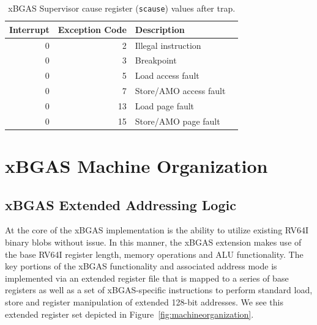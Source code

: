 \documentclass{article}
\begin{document}
\begin{table}[h!]
\begin{center}
\begin{tabular}{|r|r|l|l|}

  \hline
  Interrupt & Exception Code  & Description \\
  \hline	 
  0         & 2               & Illegal instruction \\   
  0         & 3               & Breakpoint \\
  0         & 5               & Load access fault \\
  0         & 7               & Store/AMO access fault \\
  0         & 13              & Load page fault \\
  0         & 15              & Store/AMO page fault \\
  \hline
\end{tabular}
\end{center}
\caption{xBGAS Supervisor cause register ({\tt scause}) values after trap.}
\label{scauses}
\end{table}

\clearpage
\section{xBGAS Machine Organization}

\subsection{xBGAS Extended Addressing Logic}

At the core of the xBGAS implementation is the ability to utilize existing RV64I 
binary blobs without issue.  In this manner, the xBGAS extension makes use 
of the base RV64I register length, memory operations and ALU functionality.  
The key portions of the xBGAS functionality and associated address mode 
is implemented via an extended register file that is mapped to a series 
of base registers as well as a set of xBGAS-specific instructions to perform 
standard load, store and register manipulation of extended 128-bit addresses.  We 
see this extended register set depicted in Figure~\ref{fig:machineorganization}.  
\end{document}
